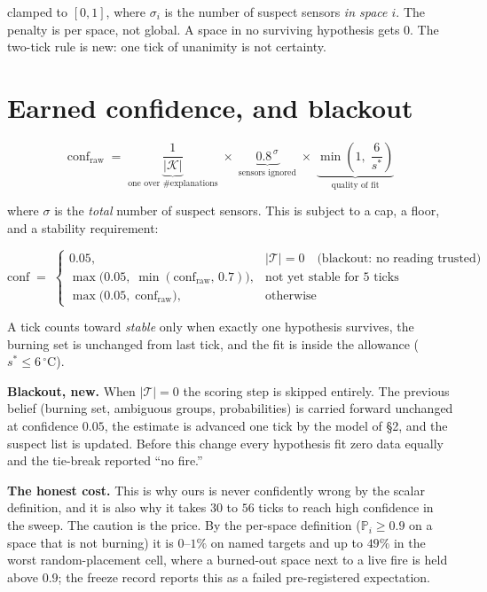 \documentclass[11pt]{article}
\newcommand{\Tset}{\mathcal{T}}
\newcommand{\Kset}{\mathcal{K}}
\newcommand{\degC}{^\circ\mathrm{C}}
\begin{document}
clamped to $[0,1]$, where $\sigma_i$ is the number of suspect sensors \emph{in space $i$}. The penalty is per space, not global. A space in no surviving hypothesis gets $0$. The two-tick rule is new: one tick of unanimity is not certainty.

\section{Earned confidence, and blackout}

\begin{equation}
  \mathrm{conf}_{\mathrm{raw}}
  \;=\;
  \underbrace{\frac{1}{|\Kset|}}_{\text{one over \# explanations}}
  \;\times\;
  \underbrace{0.8^{\,\sigma}}_{\text{sensors ignored}}
  \;\times\;
  \underbrace{\min\!\left(1,\; \frac{6}{s^{*}}\right)}_{\text{quality of fit}}
\end{equation}

where $\sigma$ is the \emph{total} number of suspect sensors. This is subject to a cap, a floor, and a stability requirement:

\begin{equation}
  \mathrm{conf} \;=\;
  \begin{cases}
    0.05, & |\Tset| = 0 \quad \text{(blackout: no reading trusted)} \\[4pt]
    \max\bigl(0.05,\; \min(\mathrm{conf}_{\mathrm{raw}},\, 0.7)\bigr),
      & \text{not yet stable for 5 ticks} \\[4pt]
    \max\bigl(0.05,\; \mathrm{conf}_{\mathrm{raw}}\bigr), & \text{otherwise}
  \end{cases}
\end{equation}

A tick counts toward \emph{stable} only when exactly one hypothesis survives, the burning set is unchanged from last tick, and the fit is inside the allowance ($s^{*} \le 6\,\degC$).

\begin{keybox}
\textbf{Blackout, new.} When $|\Tset| = 0$ the scoring step is skipped entirely. The previous belief (burning set, ambiguous groups, probabilities) is carried forward unchanged at confidence $0.05$, the estimate is advanced one tick by the model of \S2, and the suspect list is updated. Before this change every hypothesis fit zero data equally and the tie-break reported ``no fire.''

\smallskip
\textbf{The honest cost.} This is why ours is never confidently wrong by the scalar definition, and it is also why it takes $30$ to $56$ ticks to reach high confidence in the sweep. The caution is the price. By the per-space definition ($\mathbb{P}_i \ge 0.9$ on a space that is not burning) it is $0$--$1\%$ on named targets and up to $49\%$ in the worst random-placement cell, where a burned-out space next to a live fire is held above $0.9$; the freeze record reports this as a failed pre-registered expectation.
\end{keybox}
\end{document}
